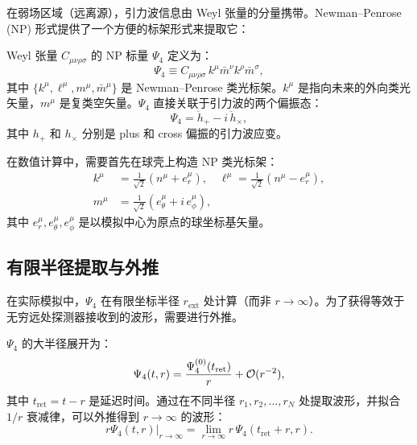 在弱场区域（远离源），引力波信息由 Weyl 张量的分量携带。Newman--Penrose (NP) 形式提供了一个方便的标架形式来提取它：

\begin{definition}[$\Psi_4$ 标量]
Weyl 张量 $C_{\mu\nu\rho\sigma}$ 的 NP 标量 $\Psi_4$ 定义为：
\begin{equation}
    \boxed{\Psi_4 \equiv C_{\mu\nu\rho\sigma} \, k^\mu \bar{m}^\nu k^\rho \bar{m}^\sigma},
    \label{eq:Psi4_def}
\end{equation}
其中 $\{k^\mu, \ell^\mu, m^\mu, \bar{m}^\mu\}$ 是 Newman--Penrose 类光标架。$k^\mu$ 是指向未来的外向类光矢量，$m^\mu$ 是复类空矢量。$\Psi_4$ 直接关联于引力波的两个偏振态：
\begin{equation}
    \boxed{\Psi_4 = \ddot{h}_+ - i\,\ddot{h}_\times},
    \label{eq:Psi4_waveform}
\end{equation}
其中 $h_+$ 和 $h_\times$ 分别是 plus 和 cross 偏振的引力波应变。
\label{def:Psi4}
\end{definition}

在数值计算中，需要首先在球壳上构造 NP 类光标架：
\begin{align}
    k^\mu &= \frac{1}{\sqrt{2}}(n^\mu + e^\mu_r), \quad
    \ell^\mu = \frac{1}{\sqrt{2}}(n^\mu - e^\mu_r), \\
    m^\mu &= \frac{1}{\sqrt{2}}(e^\mu_\theta + i\,e^\mu_\phi),
\end{align}
其中 $e^\mu_r, e^\mu_\theta, e^\mu_\phi$ 是以模拟中心为原点的球坐标基矢量。

\subsection{有限半径提取与外推}

在实际模拟中，$\Psi_4$ 在有限坐标半径 $r_{\text{ext}}$ 处计算（而非 $r \to \infty$）。为了获得等效于无穷远处探测器接收到的波形，需要进行外推。

\begin{example}[有限半径修正]
$\Psi_4$ 的大半径展开为：
\begin{equation}
    \Psi_4(t, r) = \frac{\Psi_4^{(0)}(t_{\text{ret}})}{r} + \mathcal{O}(r^{-2}),
    \label{eq:Psi4_expansion}
\end{equation}
其中 $t_{\text{ret}} = t - r$ 是延迟时间。通过在不同半径 $r_1, r_2, \ldots, r_N$ 处提取波形，并拟合 $1/r$ 衰减律，可以外推得到 $r \to \infty$ 的波形：
\begin{equation}
    r\Psi_4(t, r) \big|_{r\to\infty} = \lim_{r\to\infty} r\,\Psi_4(t_{\text{ret}} + r, r).
\end{equation}
\end{example}

